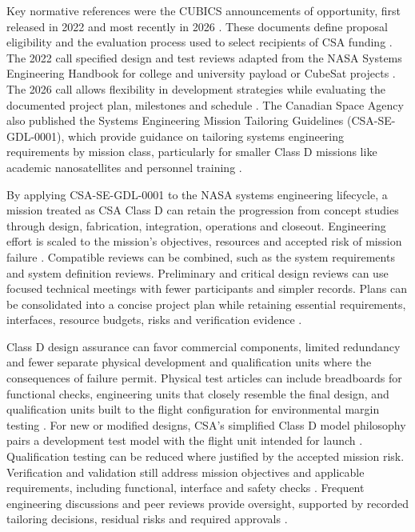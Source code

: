 Key normative references were the CUBICS announcements of opportunity, first released in 2022 and most recently in 2026 \citep{csa2022cubics,csa2026cubics}.
These documents define proposal eligibility and the evaluation process used to select recipients of CSA funding \citep[Secs.~3 and~5]{csa2026cubics}.
The 2022 call specified design and test reviews adapted from the NASA Systems Engineering Handbook for college and university payload or CubeSat projects \citep[App.~B.7]{csa2022cubics}. The 2026 call allows flexibility in development strategies while evaluating the documented project plan, milestones and schedule \citep[FAQ~24 and App.~C.2.1]{csa2026cubics}.
The Canadian Space Agency also published the Systems Engineering Mission Tailoring Guidelines (CSA-SE-GDL-0001), which provide guidance on tailoring systems engineering requirements by mission class, particularly for smaller Class D missions like academic nanosatellites and personnel training \citep[Secs.~1.1--1.3]{csa2020tailoring}.

By applying CSA-SE-GDL-0001 to the NASA systems engineering lifecycle, a mission treated as CSA Class D can retain the progression from concept studies through design, fabrication, integration, operations and closeout.
Engineering effort is scaled to the mission's objectives, resources and accepted risk of mission failure \citep[Secs.~3 and~3.11]{nasa2016systems}\citep[Sec.~3.2]{csa2020tailoring}.
Compatible reviews can be combined, such as the system requirements and system definition reviews.
Preliminary and critical design reviews can use focused technical meetings with fewer participants and simpler records.
Plans can be consolidated into a concise project plan while retaining essential requirements, interfaces, resource budgets, risks and verification evidence \citep[Sec.~3.11.4]{nasa2016systems}\citep[Secs.~4.2--4.4 and App.~B]{csa2020tailoring}.

Class D design assurance can favor commercial components, limited redundancy and fewer separate physical development and qualification units where the consequences of failure permit.
Physical test articles can include breadboards for functional checks, engineering units that closely resemble the final design, and qualification units built to the flight configuration for environmental margin testing \citep[Sec.~6.1.1.2.4]{nasa2016systems}.
For new or modified designs, CSA's simplified Class D model philosophy pairs a development test model with the flight unit intended for launch \citep[Table~4-1]{csa2020tailoring}.
Qualification testing can be reduced where justified by the accepted mission risk.
Verification and validation still address mission objectives and applicable requirements, including functional, interface and safety checks \citep[Sec.~3.3.1 and Table~4-1]{csa2020tailoring}.
Frequent engineering discussions and peer reviews provide oversight, supported by recorded tailoring decisions, residual risks and required approvals \citep[Sec.~3.4.1]{csa2020tailoring}\citep[Sec.~3.11.3]{nasa2016systems}.


